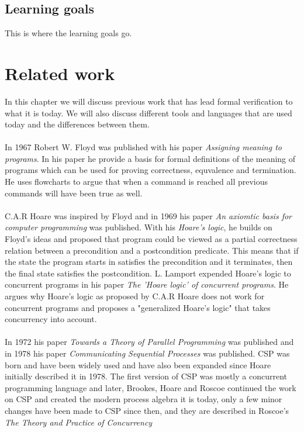 \documentclass[a4paper]{report}
\begin{document}
\section{Learning goals}
This is where the learning goals go.
\chapter{Related work}
In this chapter we will discuss previous work that has lead formal verification to what it is today. We will also discuss different tools and languages that are used today and the differences between them. \\\\
In 1967 Robert W. Floyd was published with his paper \textit{Assigning meaning to programs}\cite{Floyd1967}. In his paper he provide a basis for formal definitions of the meaning of programs which can be used for proving correctness, equvalence and termination. He uses flowcharts to argue that when a command is reached all previous commands will have been true as well.\\\\
C.A.R Hoare was inspired by Floyd and in 1969 his paper \textit{An axiomtic basis for computer programming}\cite{Hoare1969} was published. With his \textit{Hoare's logic}, he builds on Floyd's ideas and proposed that program could be viewed as a partial correctness relation between a precondition and a postcondition predicate. This means that if the state the program starts in satisfies the precondition and it terminates, then the final state satisfies the postcondition. L. Lamport expended Hoare's logic to concurrent programs in his paper \textit{The 'Hoare logic' of concurrent programs}\cite{Lamport1980}. He argues why Hoare's logic as proposed by C.A.R Hoare does not work for concurrent programs and proposes a "generalized Hoare's logic" that takes concurrency into account. \\\\
In 1972 his paper \textit{Towards a Theory of Parallel Programming} was published and in 1978 his paper \textit{Communicating Sequential Processes} was published. CSP was born and have been widely used and have also been expanded since Hoare initially described it in 1978. The first version of CSP was mostly a concurrent programming language and later, Brookes, Hoare and Roscoe\cite{Brookes1984} continued the work on CSP and created the modern process algebra it is today, only a few minor changes have been made to CSP since then, and they are described in Roscoe's \textit{The Theory and Practice of Concurrency}\cite{Roscoe1997}\\\\
\end{document}
